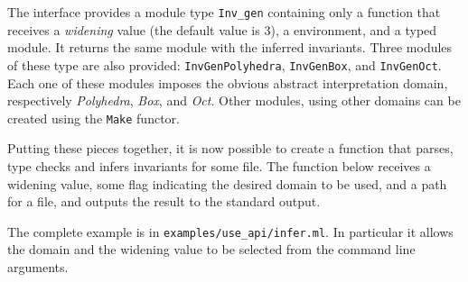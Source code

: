 The interface provides a module type \verb|Inv_gen| containing only a
function that receives a \emph{widening} value (the default value is
3), a \why environment, and a typed \why module. It returns the same
module with the inferred invariants. Three modules of these type are
also provided: \verb|InvGenPolyhedra|, \verb|InvGenBox|, and
\verb|InvGenOct|. Each one of these modules imposes the obvious
abstract interpretation domain, respectively \emph{Polyhedra},
\emph{Box}, and \emph{Oct}. Other modules, using other domains can be
created using the \verb|Make| functor.

Putting these pieces together, it is now possible to create a function
that parses, type checks and infers invariants for some \whyml file.
The function below receives a widening value, some flag indicating the
desired domain to be used, and a path for a \whyml file, and outputs
the result to the standard output.



The complete example is in \verb|examples/use_api/infer.ml|. In
particular it allows the domain and the widening value to be selected
from the command line arguments.

